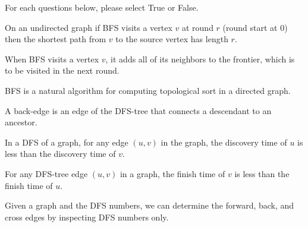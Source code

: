 \begin{problem}
For each questions below, please select True or False.

\asktf

On an undirected graph if  BFS visits a vertex $v$ at round $r$ (round
start at $0$) then the shortest path from $v$ to the source vertex has
length $r$.

\solt


\asktf

When BFS visits a vertex $v$, it adds all of its neighbors to the
frontier, which is to be visited in the next round.

\solf

\asktf

BFS is a natural algorithm for computing topological sort in a directed graph.

\solf


\asktf
A back-edge is an edge of the DFS-tree that connects a descendant to
an ancestor.
\solf

\asktf 

In a DFS of a graph, for any edge $(u,v)$ in the graph, the discovery
time of $u$ is less than the discovery time of $v$.  

\solf

\asktf 
For any DFS-tree edge $(u,v)$ in a graph, the finish time of $v$ is
less than the finish time of $u$.  
\solt

\asktf 
Given a graph and the DFS numbers, we can determine the
forward, back, and cross edges by inspecting DFS numbers only.  
\solt

\end{problem}


